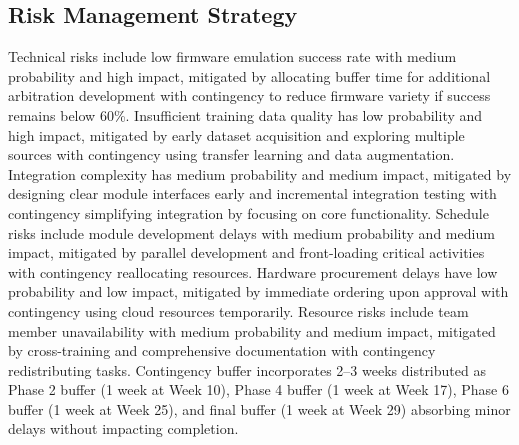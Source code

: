 \subsection{Risk Management Strategy}

Technical risks include low firmware emulation success rate with medium probability and high impact, mitigated by allocating buffer time for additional arbitration development with contingency to reduce firmware variety if success remains below 60\%. Insufficient training data quality has low probability and high impact, mitigated by early dataset acquisition and exploring multiple sources with contingency using transfer learning and data augmentation. Integration complexity has medium probability and medium impact, mitigated by designing clear module interfaces early and incremental integration testing with contingency simplifying integration by focusing on core functionality. Schedule risks include module development delays with medium probability and medium impact, mitigated by parallel development and front-loading critical activities with contingency reallocating resources. Hardware procurement delays have low probability and low impact, mitigated by immediate ordering upon approval with contingency using cloud resources temporarily. Resource risks include team member unavailability with medium probability and medium impact, mitigated by cross-training and comprehensive documentation with contingency redistributing tasks. Contingency buffer incorporates 2--3 weeks distributed as Phase 2 buffer (1 week at Week 10), Phase 4 buffer (1 week at Week 17), Phase 6 buffer (1 week at Week 25), and final buffer (1 week at Week 29) absorbing minor delays without impacting completion.